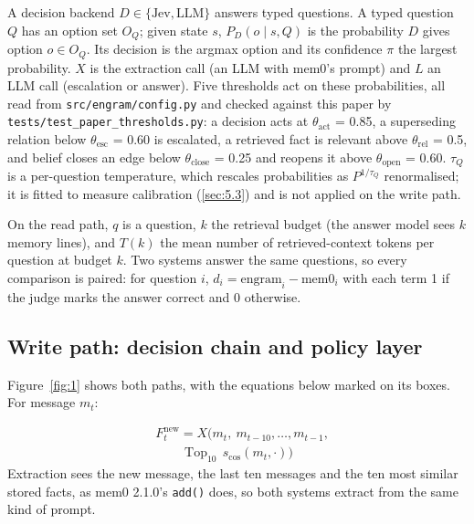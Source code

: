 \documentclass[11pt]{article}
\newcommand{\src}[1]{}
\begin{document}
A decision backend $D \in \{\text{Jev}, \text{LLM}\}$ answers typed questions. A typed question $Q$ has an option set $O_Q$; given state $s$, $P_D(o \mid s, Q)$ is the probability $D$ gives option $o \in O_Q$. Its decision is the argmax option and its confidence $\pi$ the largest probability. $X$ is the extraction call (an LLM with mem0's prompt) and $L$ an LLM call (escalation or answer). Five thresholds act on these probabilities, all read from \texttt{src/\allowbreak{}engram/\allowbreak{}config.py} and checked against this paper by \texttt{tests/\allowbreak{}test\_\allowbreak{}paper\_\allowbreak{}thresholds.py}: a decision acts at $\theta_{\text{act}}$ = 0.85\src{src/engram/config.py}, a superseding relation below $\theta_{\text{esc}}$ = 0.60\src{src/engram/config.py} is escalated, a retrieved fact is relevant above $\theta_{\text{rel}}$ = 0.5\src{src/engram/config.py}, and belief closes an edge below $\theta_{\text{close}}$ = 0.25\src{src/engram/config.py} and reopens it above $\theta_{\text{open}}$ = 0.60\src{src/engram/config.py}. $\tau_Q$ is a per-question temperature, which rescales probabilities as $P^{1/\tau_Q}$ renormalised; it is fitted to measure calibration (\cref{sec:5.3}) and is not applied on the write path.

On the read path, $q$ is a question, $k$ the retrieval budget (the answer model sees $k$ memory lines), and $T(k)$ the mean number of retrieved-context tokens per question at budget $k$. Two systems answer the same questions, so every comparison is paired: for question $i$, $d_i = \text{engram}_i - \text{mem0}_i$ with each term 1 if the judge marks the answer correct and 0 otherwise.

\subsection{Write path: decision chain and policy layer}\label{sec:3.2}
Figure~\ref{fig:1} shows both paths, with the equations below marked on its boxes. For message $m_t$:

\begin{align}
& F^{\text{new}}_t = X\bigl(m_t,\ m_{t-10}, \ldots, m_{t-1}, \nonumber\\
& \qquad \operatorname{Top}_{10}\, s_{\cos}(m_t, \cdot)\bigr) \label{eq:extract}
\end{align}
Extraction sees the new message, the last ten messages and the ten most similar stored facts, as mem0 2.1.0's \texttt{add()} does, so both systems extract from the same kind of prompt.
\end{document}
